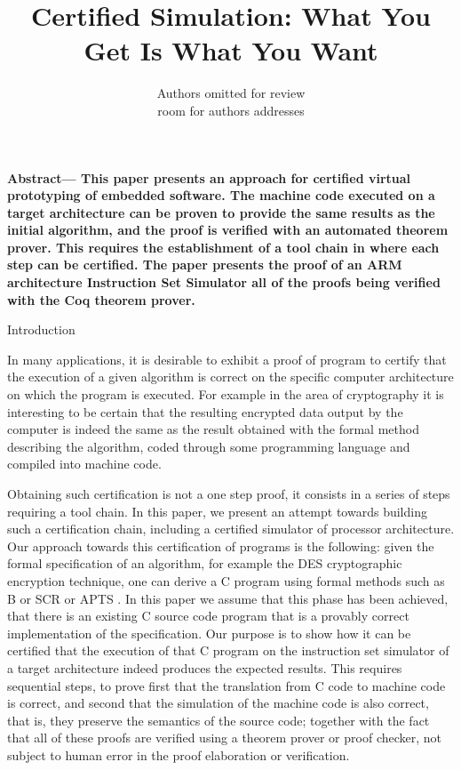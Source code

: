 \documentclass[twocolumn]{article}
\makeatletter
\def\section{\@startsection {section}{1}{\z@}{20pt plus 2pt minus 2pt}
{8pt plus 2pt minus 2pt}{\centering\normalsize\sc
\edef\@svsec{\thesection.\ }}}
\def\thesection{\Roman{section}}
\makeatother
\begin{document}
\date{}

\title{\Large\bf
Certified Simulation: What You Get Is What You Want}
\author{Authors omitted for review\\room for authors addresses\\}
\maketitle
\thispagestyle{empty}

{\small\bf Abstract---
  This paper presents an approach for certified virtual prototyping of
  embedded software. The machine code executed on a target
  architecture can be proven to provide the same results as the
  initial algorithm, and the proof is verified with an automated
  theorem prover. This requires the establishment of a tool chain in
  where each step can be certified. The paper presents the proof of an
  ARM architecture Instruction Set Simulator all of the proofs being
  verified with the Coq theorem prover.}

\section{Introduction}

In many applications, it is desirable to exhibit a proof of program to
certify that the execution of a given algorithm is correct on the
specific computer architecture on which the program is executed. For
example in the area of cryptography it is interesting to be certain
that the resulting encrypted data output by the computer is indeed the
same as the result obtained with the formal method describing the
algorithm, coded through some programming language and compiled
into machine code.

Obtaining such certification is not a one step proof, it consists in a
series of steps requiring a tool chain. In this paper, we present an
attempt towards building such a certification chain, including a
certified simulator of processor architecture. Our approach towards
this certification of programs is the following: given the formal
specification of an algorithm, for example the DES cryptographic
encryption technique, one can derive a C program using formal methods
such as B \cite{abrial-1996} or SCR \cite{rothamel-2006} or APTS
\cite{apts-2008}.  In this paper we assume that this phase has been
achieved, that there is an existing C source code program that is a
provably correct implementation of the specification. Our purpose is
to show how it can be certified that the execution of that C program
on the instruction set simulator of a target architecture indeed
produces the expected results.  This requires sequential steps, to
prove first that the translation from C code to machine code is
correct, and second that the simulation of the machine code is also
correct, that is, they preserve the semantics of the source code;
together with the fact that all of these proofs are verified using a
theorem prover or proof checker, not subject to human error in the
proof elaboration or verification.
\end{document}
